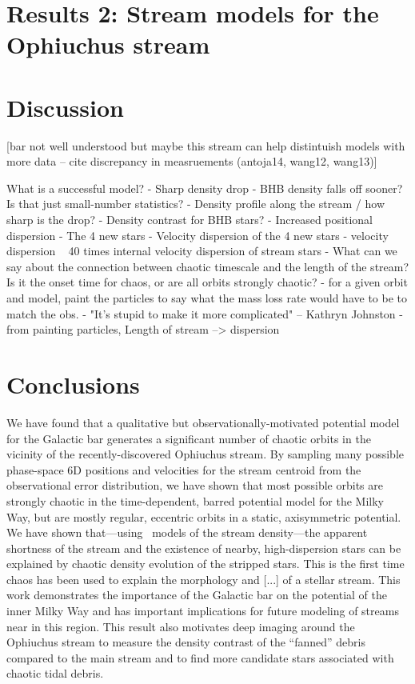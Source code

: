 \documentclass[letterpaper,12pt,preprint]{aastex}
\begin{document}
\section{Results 2: Stream models for the Ophiuchus stream}

\section{Discussion}\label{sec:discussion}

[bar not well understood but maybe this stream can help distintuish models with more data -- cite discrepancy in measruements (antoja14, wang12, wang13)]

What is a successful model?
- Sharp density drop
	- BHB density falls off sooner? Is that just small-number statistics?
	- Density profile along the stream / how sharp is the drop?
	- Density contrast for BHB stars?
- Increased positional dispersion
	- The 4 new stars
- Velocity dispersion of the 4 new stars
	- velocity dispersion ~ 40 times internal velocity dispersion of stream stars
- What can we say about the connection between chaotic timescale and the length of the stream? Is it the onset time for chaos, or are all orbits strongly chaotic?
	- for a given orbit and model, paint the particles to say what the mass loss rate would have to be to match the obs.
- "It's stupid to make it more complicated" -- Kathryn Johnston
- from painting particles, Length of stream --> dispersion

\section{Conclusions}\label{sec:conclusions}

We have found that a qualitative but observationally-motivated potential model for the Galactic bar generates a significant number of chaotic orbits in the vicinity of the recently-discovered Ophiuchus stream. By sampling many possible phase-space 6D positions and velocities for the stream centroid from the observational error distribution, we have shown that most possible orbits are strongly chaotic in the time-dependent, barred potential model for the Milky Way, but are mostly regular, eccentric orbits in a static, axisymmetric potential. We have shown that---using \streakline\ models of the stream density---the apparent shortness of the stream and the existence of nearby, high-dispersion stars can be explained by chaotic density evolution of the stripped stars. This is the first time chaos has been used to explain the morphology and [...] of a stellar stream. This work demonstrates the importance of the Galactic bar on the potential of the inner Milky Way and has important implications for future modeling of streams near in this region. This result also motivates deep imaging around the Ophiuchus stream to measure the density contrast of the ``fanned'' debris compared to the main stream and to find more candidate stars associated with chaotic tidal debris.
\end{document}
